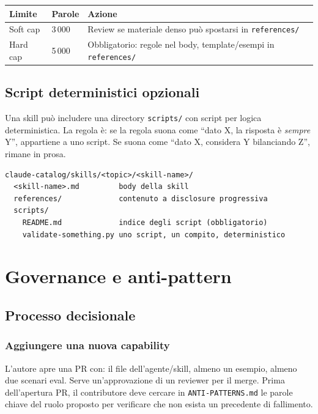 \documentclass[12pt,a4paper,twoside]{book}
\begin{document}
\begin{center}
\begin{tabular}{lll}
\toprule
\textbf{Limite} & \textbf{Parole} & \textbf{Azione} \\
\midrule
Soft cap & 3\,000 & Review se materiale denso può spostarsi in \texttt{references/} \\
Hard cap & 5\,000 & Obbligatorio: regole nel body, template/esempi in \texttt{references/} \\
\bottomrule
\end{tabular}
\end{center}

\section{Script deterministici opzionali}

Una skill può includere una directory \texttt{scripts/} con script per logica deterministica. La regola è: se la regola suona come ``dato X, la risposta è \textit{sempre} Y'', appartiene a uno script. Se suona come ``dato X, considera Y bilanciando Z'', rimane in prosa.

\begin{lstlisting}
claude-catalog/skills/<topic>/<skill-name>/
  <skill-name>.md         body della skill
  references/             contenuto a disclosure progressiva
  scripts/
    README.md             indice degli script (obbligatorio)
    validate-something.py uno script, un compito, deterministico
\end{lstlisting}

\chapter{Governance e anti-pattern}

\section{Processo decisionale}

\subsection{Aggiungere una nuova capability}

L'autore apre una PR con: il file dell'agente/skill, almeno un esempio, almeno due scenari eval. Serve un'approvazione di un reviewer per il merge. Prima dell'apertura PR, il contributore deve cercare in \texttt{ANTI-PATTERNS.md} le parole chiave del ruolo proposto per verificare che non esista un precedente di fallimento.
\end{document}
